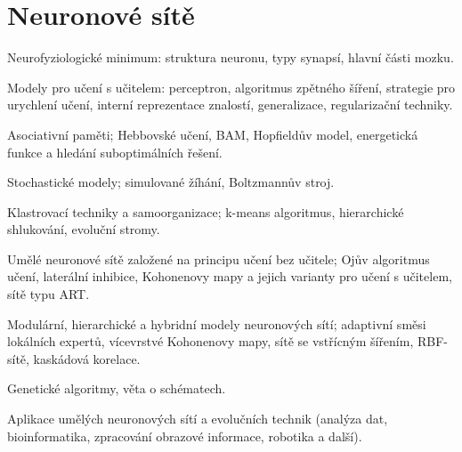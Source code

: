 \newpage
\section{Neuronové sítě}
\begin{pozadavky}
\begin{pitemize}
\item Neurofyziologické minimum: struktura neuronu, typy synapsí, hlavní části mozku.
\item Modely pro učení s učitelem: perceptron, algoritmus zpětného šíření, strategie pro urychlení učení, interní reprezentace znalostí, generalizace, regularizační techniky.
\item Asociativní paměti; Hebbovské učení, BAM, Hopfieldův model, energetická funkce a hledání suboptimálních řešení.
\item Stochastické modely; simulované žíhání, Boltzmannův stroj.
\item Klastrovací techniky a samoorganizace; k-means algoritmus, hierarchické shlukování, evoluční stromy.
\item Umělé neuronové sítě založené na principu učení bez učitele; Ojův algoritmus učení, laterální inhibice, Kohonenovy mapy a jejich varianty pro učení s učitelem, sítě typu ART.
\item Modulární, hierarchické a hybridní modely neuronových sítí; adaptivní směsi lokálních expertů, vícevrstvé Kohonenovy mapy, sítě se vstřícným šířením, RBF-sítě, kaskádová korelace.
\item Genetické algoritmy, věta o schématech.
\item Aplikace umělých neuronových sítí a evolučních technik (analýza dat, bioinformatika, zpracování obrazové informace, robotika a další).
\end{pitemize}
\end{pozadavky}